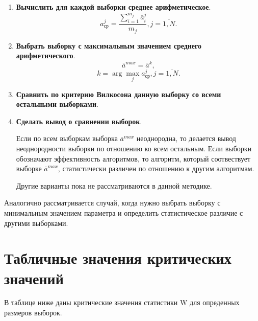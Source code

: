 \documentclass[a4paper,12pt]{article}
\begin{document}
\begin{enumerate}
\item \textbf{Вычислить для каждой выборки среднее арифметическое}.
\begin{equation}
a^j_{\text{ср}}=\dfrac{\sum_{i=1}^{m_j} \bar{a}^j_{i}}{m_j}, j=\overline{1,N}.
\end{equation}

\item \textbf{Выбрать выборку с максимальным значением среднего арифметического}.
\begin{equation}
\bar{a}^{max}=\bar{a}^{k},
\end{equation}
\begin{equation*}
k=\arg {\max_{j} {a^j_{\text{ср}}}}, j=\overline{1,N}.
\end{equation*}

\item \textbf{Сравнить по критерию Вилкосона данную выборку со всеми остальными выборками}.

\item \textbf{Сделать вывод о сравнении выборок}.

Если по всем выборкам выборка $\bar{a}^{max}$ неоднородна, то делается вывод неоднородности выборки по отношению ко всем остальным. Если выборки обозначают эффективность алгоритмов, то алгоритм, который соотвествует выборке $\bar{a}^{max}$, статистически различен по отношению к другим алгоритмам.

Другие варианты пока не рассматриваются в данной методике.
\end{enumerate}

Аналогично рассматривается случай, когда нужно выбрать выборку с минимальным значением параметра и определить статистическое различие с другими выборками.

\newpage
\section{Табличные значения критических значений}\label{WilcoxonW:section_table}

В таблице ниже даны критические значения статистики W для опреденных размеров выборок.
\end{document}

